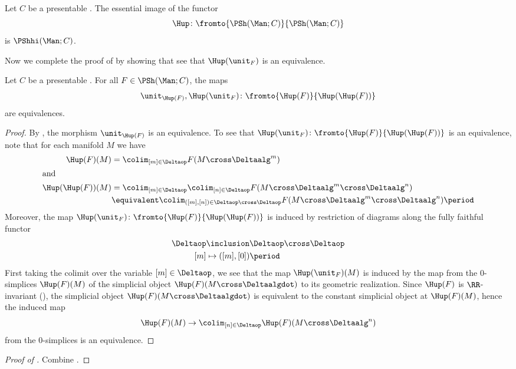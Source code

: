 \begin{corollary}\label{cor:essentialimageofH}
	Let $ C $ be a presentable \category.
	The essential image of the functor
	\begin{equation*}
		 \Hup \colon \fromto{\PSh(\Man;C)}{\PSh(\Man;C)}
	\end{equation*}
	is $ \PShhi(\Man;C) $. 
\end{corollary}

Now we complete the proof of  by showing that see that $ \Hup(\unit_F) $ is an equivalence.

\begin{lemma}\label{lem:alphaequivs}
	Let $ C $ be a presentable \category.
	For all $ F \in \PSh(\Man;C) $, the maps
	\begin{equation*}
		\unit_{\Hup(F)}, \Hup(\unit_F)  \colon \fromto{\Hup(F)}{\Hup(\Hup(F))}
	\end{equation*}
	are equivalences.
\end{lemma}

\begin{proof}
	By , the morphism $ \unit_{\Hup(F)} $ is an equivalence.
	To see that $ \Hup(\unit_F) \colon \fromto{\Hup(F)}{\Hup(\Hup(F))} $ is an equivalence, note that for each manifold $ M $ we have
	\begin{align*}
		\Hup(F)(M) &= \colim_{[m] \in \Deltaop} F(M \cross \Deltaalg^m) \\
		\intertext{and} 
		\Hup(\Hup(F))(M) &= \colim_{[m] \in \Deltaop} \colim_{[n] \in \Deltaop} F(M \cross \Deltaalg^m \cross \Deltaalg^n) \\ 
		&\equivalent \colim_{([m],[n]) \in \Deltaop \cross \Deltaop} F(M \cross \Deltaalg^m \cross \Deltaalg^n) \period
	\end{align*} 
	Moreover, the map $ \Hup(\unit_F) \colon \fromto{\Hup(F)}{\Hup(\Hup(F))} $ is induced by restriction of diagrams along the fully faithful functor
	\begin{align*}
		\Deltaop &\inclusion \Deltaop \cross \Deltaop \\ 
		[m] &\mapsto ([m],[0]) \period
	\end{align*}
	First taking the colimit over the variable $ [m] \in \Deltaop $, we see that the map $ \Hup(\unit_F)(M) $ is induced by the map from the $ 0 $-simplices $ \Hup(F)(M) $ of the simplicial object $ \Hup(F)(M \cross \Deltaalgdot) $ to its geometric realization.
	Since $ \Hup(F) $ is $ \RR $-invariant (), the simplicial object $ \Hup(F)(M \cross \Deltaalgdot) $ is equivalent to the constant simplicial object at $ \Hup(F)(M) $, hence the induced map 
	\begin{equation*}
		\Hup(F)(M) \to \colim_{[n] \in \Deltaop} \Hup(F)(M \cross \Deltaalg^n) 
	\end{equation*}
	from the $ 0 $-simplices is an equivalence.
\end{proof}

\begin{proof}[Proof of ]
	Combine .
\end{proof}
